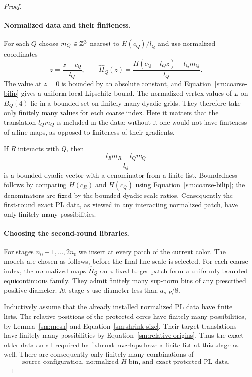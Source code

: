 \begin{proof}
\paragraph{Normalized data and their finiteness.}
For each $Q$ choose $m_Q\in\mathbb Z^3$ nearest to
$H(c_Q)/l_Q$ and use normalized coordinates
\begin{equation}
 \label{sm:normalization}
 z=\frac{x-c_Q}{l_Q},\qquad
 \widehat H_Q(z)=\frac{H(c_Q+l_Qz)-l_Qm_Q}{l_Q}.
\end{equation}
The value at $z=0$ is bounded by an absolute constant,
and Equation~\eqref{sm:coarse-bilip} gives a uniform local
Lipschitz bound.  The normalized vertex values of $L$
on $B_Q(4)$ lie in a bounded set on finitely many
dyadic grids.  They therefore take only finitely many
values for each coarse index.  Here it matters that
the translation $l_Qm_Q$ is included in the data:
without it one would not have finiteness of affine
maps, as opposed to finiteness of their gradients.

If $R$ interacts with $Q$, then
\begin{equation}
 \label{sm:relative-origins}
 \frac{l_Rm_R-l_Qm_Q}{l_Q}
\end{equation}
is a bounded dyadic vector with a denominator from a
finite list.  Boundedness follows by comparing
$H(c_R)$ and $H(c_Q)$ using Equation~\eqref{sm:coarse-bilip};
the denominators are fixed by the bounded dyadic
scale ratios.  Consequently the first-round exact
PL data, as viewed in any interacting normalized
patch, have only finitely many possibilities.

\paragraph{Choosing the second-round libraries.}
For stages $n_0+1,\ldots,2n_0$ we insert at every
patch of the current color.  The models are chosen
as follows, before the final fine scale is selected.
For each coarse index, the normalized maps
$\widehat H_Q$ on a fixed larger patch form a
uniformly bounded equicontinuous family.  They
admit finitely many sup-norm bins of any prescribed
positive diameter.  At stage $s$ use diameter less
than $a_{s,P}/8$.

Inductively assume that the already installed
normalized PL data have finite lists.  The
relative positions of the protected cores have
finitely many possibilities, by
Lemma~\ref{sm:mesh} and Equation~\eqref{sm:shrink-size}.
Their target translations have finitely many
possibilities by Equation~\eqref{sm:relative-origins}.
Thus the exact older data on all required
half-shrunk overlaps have a finite list at this
stage as well.  There are consequently only
finitely many combinations of
\begin{equation}
 \label{sm:model-combination}
 \text{source configuration, normalized }H\text{-bin,
 and exact protected PL data}.
\end{equation}


\end{proof}
